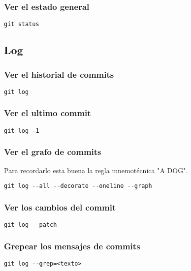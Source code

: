 \documentclass[11pt]{article}
\begin{document}
\subsubsection{Ver el estado general}
\label{sec:org2d1ce86}
\begin{verbatim}
git status
\end{verbatim}

\subsection{Log}
\label{sec:org48a8df4}
\subsubsection{Ver el historial de commits}
\label{sec:orga65e43f}
\begin{verbatim}
git log
\end{verbatim}

\subsubsection{Ver el ultimo commit}
\label{sec:org61ce05f}
\begin{verbatim}
git log -1
\end{verbatim}

\subsubsection{Ver el grafo de commits}
\label{sec:org707b543}
Para recordarlo esta buena la regla mnemotécnica "A DOG". 
\begin{verbatim}
git log --all --decorate --oneline --graph
\end{verbatim}

\subsubsection{Ver los cambios del commit}
\label{sec:org5f29363}
\begin{verbatim}
git log --patch
\end{verbatim}

\subsubsection{Grepear los mensajes de commits}
\label{sec:org92278bb}
\begin{verbatim}
git log --grep=<texto>
\end{verbatim}
\end{document}
